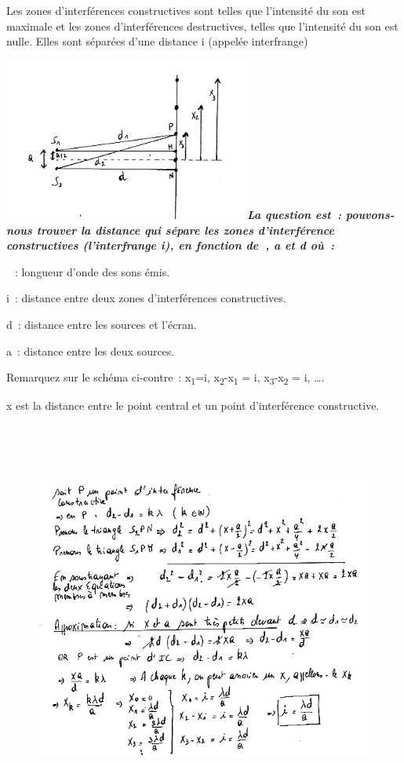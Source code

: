 Les zones d'interférences constructives sont telles que l'intensité du
son est maximale et les zones d'interférences destructives, telles que
l'intensité du son est nulle. Elles sont séparées d'une distance i
(appelée interfrange)

\includegraphics[width=8.123cm,height=5.352cm]{Pictures/100000010000018B00000104CBB3B40EFC3646D7.png}\emph{\textbf{La
question est~: pouvons-nous trouver la distance qui sépare les zones
d'interférence constructives (l'interfrange i), en fonction de
}\textbf{}\textbf{, a et d où~: }}

~: longueur d'onde des sons émis.

i~: distance entre deux zones d'interférences constructives.

d~: distance entre les sources et l'écran.

a~: distance entre les deux sources.

Remarquez sur le schéma ci-contre~: x\textsubscript{1}=i,
x\textsubscript{2}-x\textsubscript{1} = i,
x\textsubscript{3}-x\textsubscript{2} = i, \ldots.

x est la distance entre le point central et un point d'interférence
constructive.

\begin{figure}
\centering
\includegraphics[width=17.253cm,height=13.09cm]{Pictures/100000010000025F000001F704069EFE234008BD.png}
\caption{}
\end{figure}

